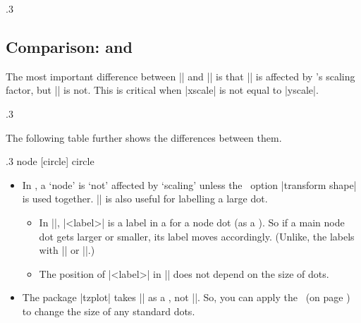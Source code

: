 \begin{tzcode}{.3}
\end{tzcode}


\subsection{Comparison: \protect\cmd{\tzdot} and \protect\cmd{\tzcdot}}
\label{ss:tzdot:comparison}

The most important difference between |\tzcdot| and |\tzdot| is that |\tzcdot| is affected by \Tikz's scaling factor, but |\tzdot| is not.
This is critical when |xscale| is not equal to |yscale|.

\begin{tzcode}{.3}
\end{tzcode}

The following table further shows the differences between them.

\begin{tzcode}[listing only,colback=green!10!white]{.3}
node [circle]   \tzdot    \tzdots    \settzdotsize      [tzdot=2.4pt]  %
circle          \tzcdot   \tzcdots   \settzcdotradius   [tzcdot=1.2pt] %
\end{tzcode}

\remark 
\begin{itemize}\firmlist
\item In \Tikz, a `node' is `not' affected by `scaling' unless the \Tikz\ option |transform shape| is used together.
|\tzdot| is also useful for labelling a large dot.
  \begin{itemize}
  \item In |\tzdot|, |<label>| is a label in a  for a node dot (as a ).
  So if a main node dot gets larger or smaller, its label moves accordingly. 
  (Unlike, the labels with |\tzcdot| or |\tzcdots|.)
  \item The position of |<label>| in |\tzcdot| does not depend on the size of dots.
  \end{itemize}
\item The package |tzplot| takes |\tzdot| as a , not |\tzcdot|.
So, you can apply the \threeways\ (on page \pageref{ss:threeways}) to change the size of any standard dots.
\end{itemize}


